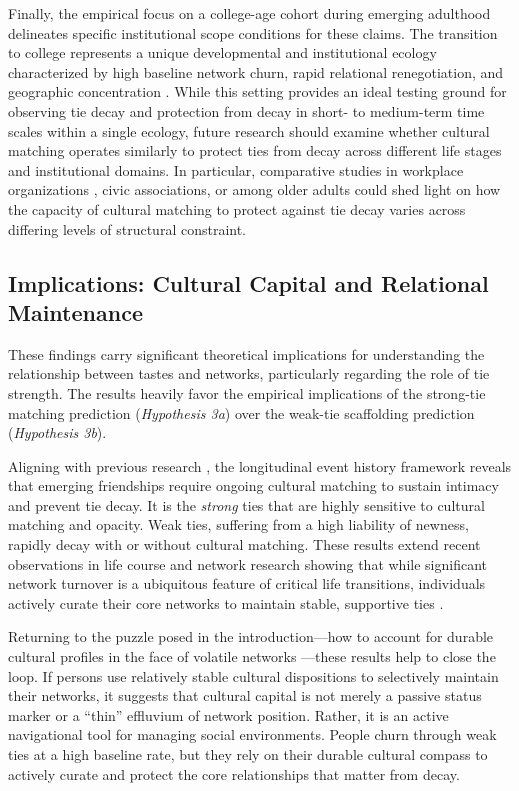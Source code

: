 \documentclass[12pt,letterpaper]{article}
\begin{document}
Finally, the empirical focus on a college-age cohort during emerging adulthood delineates specific institutional scope conditions for these claims. The transition to college represents a unique developmental and institutional ecology characterized by high baseline network churn, rapid relational renegotiation, and geographic concentration \citep{mcfarland2014network-735}. While this setting provides an ideal testing ground for observing tie decay and protection from decay in short- to medium-term time scales within a single ecology, future research should examine whether cultural matching operates similarly to protect ties from decay across different life stages and institutional domains. In particular, comparative studies in workplace organizations \citep{mcfarland2014network-735, kim2024networking-a1c}, civic associations, or among older adults \citep{cornwell2008social-257} could shed light on how the capacity of cultural matching to protect against tie decay varies across differing levels of structural constraint.

\subsection{Implications: Cultural Capital and Relational Maintenance}\label{implications}
These findings carry significant theoretical implications for understanding the relationship between tastes and networks, particularly regarding the role of tie strength. The results heavily favor the empirical implications of the strong-tie matching prediction (\textit{Hypothesis 3a}) over the weak-tie scaffolding prediction (\textit{Hypothesis 3b}). 

Aligning with previous research \citep{edelmann2014cultural-a77, vaisey2010}, the longitudinal event history framework reveals that emerging friendships require ongoing cultural matching to sustain intimacy and prevent tie decay. It is the \textit{strong} ties that are highly sensitive to cultural matching and opacity. Weak ties, suffering from a high liability of newness, rapidly decay with or without cultural matching. These results extend recent observations in life course and network research showing that while significant network turnover is a ubiquitous feature of critical life transitions, individuals actively curate their core networks to maintain stable, supportive ties \citep{roy2022turnover, weiss2022life, kempnich2024how, vacchiano2024networked}. 

Returning to the puzzle posed in the introduction---how to account for durable cultural profiles in the face of volatile networks \citep{bourdieu1984, holt1998}---these results help to close the loop. If persons use relatively stable cultural dispositions to selectively maintain their networks, it suggests that cultural capital is not merely a passive status marker or a ``thin'' effluvium of network position. Rather, it is an active navigational tool for managing social environments. People churn through weak ties at a high baseline rate, but they rely on their durable cultural compass to actively curate and protect the core relationships that matter from decay.
\end{document}
